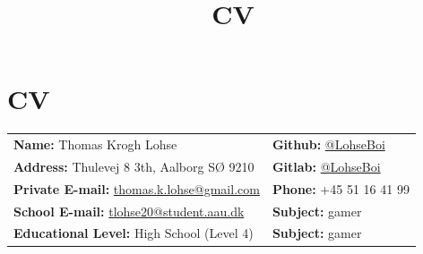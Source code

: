 \documentclass{article}
\title{\bfseries\Huge CV}
\date{}
\begin{document}
\section*{\Huge CV}


\begin{minipage}{0.76\textwidth}
    \begin{tabular}{ll}
        \toprule%
        \textbf{Name:} Thomas Krogh Lohse                 
            & \textbf{Github:} \href{https://github.com/LohseBoi}{@LohseBoi} \\[2pt]
        \textbf{Address:} Thulevej 8 3th, Aalborg SØ 9210 
            & \textbf{Gitlab:} \href{https://gitlab.com/LohseBoi}{@LohseBoi} \\[2pt]
        \textbf{Private E-mail:} \href{mailto:thomas.k.lohse@gmail.com}{thomas.k.lohse@gmail.com} 
            & \textbf{Phone:} +45 51 16 41 99 \\[2pt]
        \textbf{School E-mail:} \href{mailto:tlohse20@student.aau.dk}{tlohse20@student.aau.dk}   
            & \textbf{Subject:} gamer \\[2pt]
        \textbf{Educational Level:} High School (Level 4) & \textbf{Subject:} gamer \\%
        \bottomrule
    \end{tabular}
\end{minipage}
\begin{minipage}{0.2\textwidth}
\end{minipage}
\\
\end{document}
